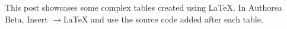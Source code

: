 This post showcases some complex tables created using LaTeX. In Authorea Beta, Insert $\rightarrow$LaTeX and use the source code added after each table.

\newline